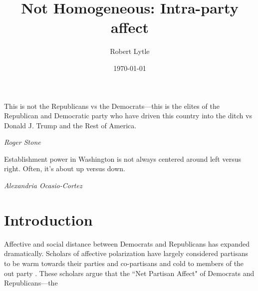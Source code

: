 \documentclass[12pt]{paper}
\begin{document}
\title{Not Homogeneous: Intra-party affect}
\author{Robert Lytle}
\date{\today}
\maketitle
\epigraph{This is not the Republicans vs the Democrats---this is the elites of the Republican and Democratic party who have driven this country into the ditch vs Donald J. Trump and the Rest of America.}{\textit{Roger Stone %
}}
\epigraph{Establishment power in Washington is not always centered around left versus right. Often, it’s about up versus down.}{\textit{Alexandria Ocasio-Cortez}}



\section{Introduction}
Affective and social distance between Democrats and Republicans has expanded dramatically. Scholars of affective polarization have largely considered partisans to be warm towards their parties and co-partisans and cold to members of the out party \citep{iyengar2012affect, iyengar2018strengthening}. These scholars argue that the ``Net Partisan Affect" of Democrats and Republicans---the
\end{document}
